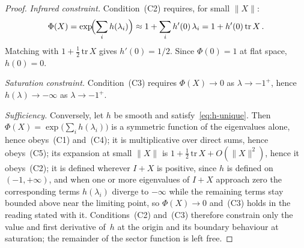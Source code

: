 \documentclass[pdflatex,sn-mathphys-num]{sn-jnl} %
\theoremstyle{remark}
\theoremstyle{plain}
\begin{document}
    \begin{proof}
      \textit{Infrared constraint.}\;
      Condition~(C2) requires, for small $\|X\|$:
      \[
        \Phi(X)
        = \exp\!\Bigl(\sum_i h(\lambda_i)\Bigr)
        \approx 1 + \sum_i h'(0)\,\lambda_i
        = 1 + h'(0)\,\mathrm{tr}\, X\,.
      \]
      Matching with $1 + \tfrac{1}{2}\,\mathrm{tr}\, X$
      gives $h'(0) = 1/2$.
      Since $\Phi(0) = 1$ at flat space, $h(0) = 0$.

      \textit{Saturation constraint.}\;
      Condition~(C3) requires $\Phi(X) \to 0$ as
      $\lambda \to -1^+$, hence
      $h(\lambda) \to -\infty$ as $\lambda \to -1^+$.

      \textit{Sufficiency.}\;
      Conversely, let $h$ be smooth and
      satisfy~\eqref{eq:h-unique}.
      Then $\Phi(X) = \exp\bigl(\sum_i h(\lambda_i)\bigr)$
      is a symmetric function of the eigenvalues alone,
      hence obeys~(C1) and~(C4); it is multiplicative over
      direct sums, hence obeys~(C5); its expansion at small
      $\|X\|$ is
      $1 + \tfrac12\,\mathrm{tr}\,X + O(\|X\|^2)$,
      hence it obeys~(C2); it is defined wherever $I + X$ is
      positive, since $h$ is defined on $(-1, +\infty)$, and
      when one or more eigenvalues of $I + X$ approach zero
      the corresponding terms $h(\lambda_i)$ diverge to
      $-\infty$ while the remaining terms stay bounded above
      near the limiting point, so $\Phi(X) \to 0$ and~(C3)
      holds in the reading stated with it.
      Conditions~(C2) and~(C3) therefore constrain only the
      value and first derivative of~$h$ at the origin and
      its boundary behaviour at saturation; the remainder of
      the sector function is left free.
    \end{proof}
\end{document}
